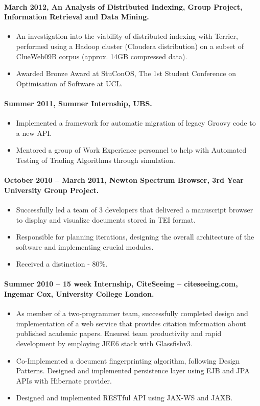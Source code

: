 \documentclass[11pt, a4paper]{article}
\newlength{\wideitemsep}
\let\olditem\item
\renewcommand{\item}{\setlength{\itemsep}{\wideitemsep}\olditem}
\begin{document}
\paragraph{March 2012, An Analysis of Distributed Indexing, Group Project, Information Retrieval and Data Mining.}
\begin{itemize}
\item An investigation into the viability of distributed indexing with Terrier, performed using a Hadoop cluster (Cloudera distribution) on a subset of ClueWeb09B corpus (approx. 14GB compressed data).
\item Awarded Bronze Award at StuConOS, The 1st Student Conference on Optimisation of Software at UCL.
\end{itemize}

\paragraph{Summer 2011, Summer Internship, UBS.}
\begin{itemize}
\item Implemented a framework for automatic migration of legacy Groovy code to a new API.
\item Mentored a group of Work Experience personnel to help with Automated Testing of Trading Algorithms through simulation.
\end{itemize}

\paragraph{October 2010 – March 2011, Newton Spectrum Browser, 3rd Year University Group Project.}
\begin{itemize}
\item Successfully led a team of 3 developers that delivered a manuscript browser to display and visualize documents stored in TEI format.
\item Responsible for planning iterations, designing the overall architecture of the software and implementing crucial modules. 
\item Received a distinction - 80\%.
\end{itemize}

\paragraph{Summer 2010 – 15 week Internship, CiteSeeing – citeseeing.com, Ingemar Cox, University College London.}
\begin{itemize}
\item As member of a two-programmer team, successfully completed design and implementation of a web service that provides citation information about published academic papers. Ensured team productivity and rapid development by employing JEE6 stack with Glassfishv3.
\item Co-Implemented a document fingerprinting algorithm, following Design Patterns. Designed and implemented persistence layer using EJB and JPA APIs with Hibernate provider.
\item Designed and implemented RESTful API using JAX-WS and JAXB.
\end{itemize}
\end{document}
